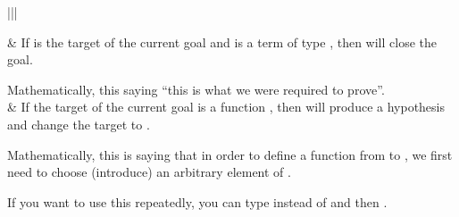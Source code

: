 \documentclass[letterpaper,10pt,english]{sphinxmanual}
\begin{document}
\begin{savenotes}\sphinxattablestart
\centering
\begin{tabular}[t]{|||}
\hline

\sphinxAtStartPar
{}
&
\sphinxAtStartPar
If  is the target of the current goal
and  is a term of type ,
then  will close the goal.

\sphinxAtStartPar
Mathematically, this saying “this is what we were required to prove”.
\\
\hline
\sphinxAtStartPar
{}
&
\sphinxAtStartPar
If the target of the current goal is a function ,
then  will produce a hypothesis
 and change the target to  .

\sphinxAtStartPar
Mathematically, this is saying that in order to define a function from  to ,
we first need to choose (introduce) an arbitrary element of .

\sphinxAtStartPar
If you want to use this repeatedly, you can type  instead of  and then .
\\
\hline
\end{tabular}
\par
\sphinxattableend\end{savenotes}
\end{document}
